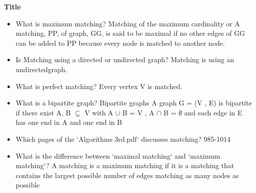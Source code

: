 \question \textbf{Title}

\begin{parts}
    \begin{itemize}
        \item What is maximum matching?
        Matching of the maximum cardinality or A matching, PP, of graph, GG, is said to be maximal if no other edges of GG can be added to PP because every node is matched to another node. 
        \item Is Matching using a directed or undirected graph?
        Matching is using an undirectedgraph. 
        \item What is perfect matching?
        Every vertex V is matched. 
        \item What is a bipartite graph?
        Bipartite graphs
        A graph G = (V , E) is bipartite if there exist A, B $\subseteq$ V with A $\cup$ B = V , A $\cap$ B = $\emptyset$ and each edge in E has one end in A and one end in B
        \item Which pages of the ‘Algorithms 3rd.pdf‘ discusses matching?
        985-1014
        \item What is the difference between ‘maximal matching‘ and ‘maximum matching‘?
        A matching is a maximum matching if it is a matching that contains the largest possible number of edges matching as many nodes as possible
        \end{itemize}

\end{parts}


